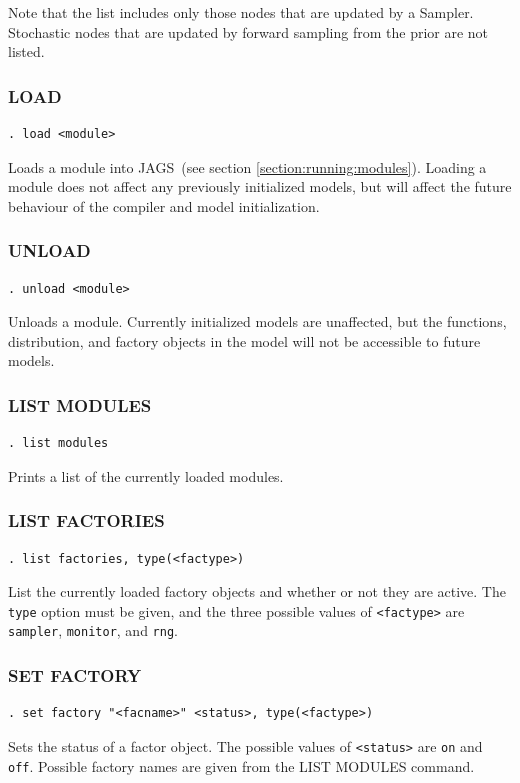 \documentclass[11pt, a4paper, titlepage]{report}
\newcommand{\JAGS}{\textsf{JAGS}}
\begin{document}
Note that the list includes only those nodes that are updated by a
Sampler.  Stochastic nodes that are updated by forward sampling from
the prior are not listed.

\subsubsection{LOAD}
\label{load}
\begin{verbatim}
. load <module>
\end{verbatim}
Loads a module into \JAGS\ (see section \ref{section:running:modules}). Loading
a module does not affect any previously initialized models, but will
affect the future behaviour of the compiler and model initialization.

\subsubsection{UNLOAD}
\label{unload}
\begin{verbatim}
. unload <module>
\end{verbatim}
Unloads a module. Currently initialized models are unaffected, but
the functions, distribution, and factory objects in the model will not
be accessible to future models.

\subsubsection{LIST MODULES}
\label{list:modules}
\begin{verbatim}
. list modules
\end{verbatim}
Prints a list of the currently loaded modules.

\subsubsection{LIST FACTORIES}
\label{list:factories}
\begin{verbatim}
. list factories, type(<factype>)
\end{verbatim}
List the currently loaded factory objects and whether or not they are
active.  The \verb+type+ option must be given, and the three possible values
of \verb+<factype>+ are \verb+sampler+, \verb+monitor+, and \verb+rng+.

\subsubsection{SET FACTORY}
\label{set:factory}
\begin{verbatim}
. set factory "<facname>" <status>, type(<factype>)
\end{verbatim}
Sets the status of a factor object. The possible values of \verb+<status>+
are \verb+on+ and \verb+off+. Possible factory names are given from the
LIST MODULES command.
\end{document}
